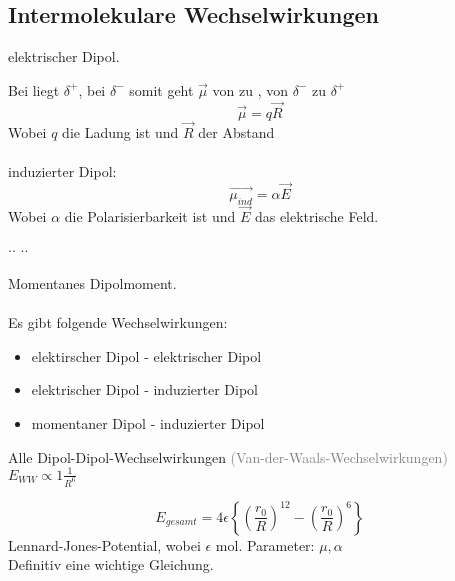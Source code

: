 \documentclass[a4paper, fleqn]{article}
\begin{document}
\subsection{Intermolekulare Wechselwirkungen}
elektrischer Dipol.\\
\begin{center}
\end{center}
Bei  liegt $\delta^+$, bei  $\delta^-$ somit geht $\vec{\mu}$ von  zu , von $\delta^-$ zu $\delta^+$\\
\begin{equation*}
    \vec{\mu} = q \vec{R}
\end{equation*}
Wobei $q$ die Ladung ist und $\vec{R}$ der Abstand\\\\
induzierter Dipol:
\begin{equation*}
    \vec{\mu_{ind}}=\alpha \vec{E}
\end{equation*}
Wobei $\alpha$ die Polarisierbarkeit ist und $\vec{E}$ das elektrische Feld.\\
\begin{center}
    $\cdot$$\cdot$ \ce{->} $\cdot$$\cdot$
\end{center}
Momentanes Dipolmoment.\\\\
Es gibt folgende Wechselwirkungen:
\begin{itemize}
    \item elektirscher Dipol - elektrischer Dipol
    \item elektrischer Dipol - induzierter Dipol
    \item momentaner Dipol - induzierter Dipol
\end{itemize}
Alle Dipol-Dipol-Wechselwirkungen \textcolor{gray}{(Van-der-Waals-Wechselwirkungen)}\\
$E_{WW} \propto 1\frac{1}{R^6}$\\
\begin{equation*}
    E_{gesamt}=4\epsilon\left\{\left(\frac{r_0}{R}\right)^{12}-\left(\frac{r_0}{R}\right)^6\right\}
\end{equation*}
Lennard-Jones-Potential, wobei $\epsilon$ mol. Parameter: $\mu, \alpha$\\
Definitiv eine wichtige Gleichung.
\end{document}
